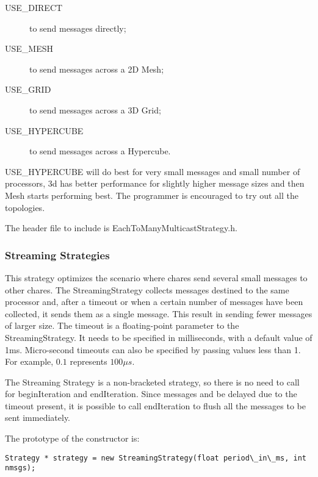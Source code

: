 {\begin{description}
\item[USE\_DIRECT] to send messages directly;
\item[USE\_MESH] to send messages across a 2D Mesh;
\item[USE\_GRID] to send messages across a 3D Grid;
\item[USE\_HYPERCUBE] to send messages across a Hypercube.
\end{description}

USE\_HYPERCUBE will do best for very small messages and small number of
processors, 3d has better performance for slightly higher message sizes and then
Mesh starts performing best. The programmer is encouraged to try out all the
topologies.

The header file to include is {\textrm{EachToManyMulticastStrategy.h}}.









\subsubsection{Streaming Strategies}

This strategy optimizes the scenario where chares send several small messages to
other chares. The StreamingStrategy collects messages destined to the same
processor and, after a timeout or when a certain number of messages have been
collected, it sends them as a single message. This result in sending fewer
messages of larger size. The timeout is a floating-point parameter to the
StreamingStrategy. It needs to be specified in milliseconds, with a default
value of 1ms. Micro-second timeouts can also be specified by passing values less
than 1. For example, $0.1$ represents $100\mu s$.

The Streaming Strategy is a non-bracketed strategy, so there is no need to call
for {\textrm{beginIteration}} and {\textrm{endIteration}}. Since messages and be
delayed due to the timeout present, it is possible to call
{\textrm{endIteration}} to flush all the messages to be sent immediately.

The prototype of the constructor is:

\begin{verbatim}
Strategy * strategy = new StreamingStrategy(float period\_in\_ms, int nmsgs);
\end{verbatim}

}
